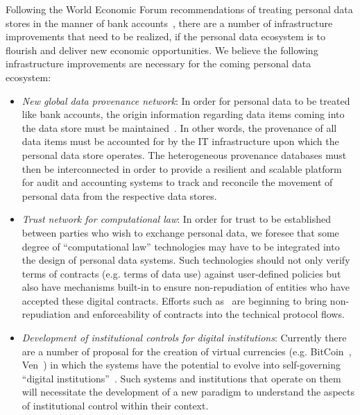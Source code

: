Following the World Economic Forum recommendations of treating personal data stores in the manner
of bank accounts~\cite{WEF2011}, there are a number of infrastructure improvements that need
to be realized, if the personal data ecosystem is to flourish and deliver new economic opportunities.
We believe the following infrastructure improvements are necessary for the coming personal data ecosystem:
\begin{itemize}
\item  {\em New global data provenance network}:  In order for personal data to be treated
like bank accounts, the origin information regarding data items coming into the data store
must be maintained~\cite{HardjonoGreenwood2013}. 
In other words, the provenance of all data items must be
accounted for by the IT infrastructure upon which the personal data store operates.
The heterogeneous provenance databases must then be interconnected in order
to provide a resilient and scalable platform for audit and accounting systems
to track and reconcile the movement of personal data from the respective data stores.

\item  {\em Trust network for computational law}: In order for trust to be established between
parties who wish to exchange personal data, we foresee that some degree of ``computational law''
technologies may have to be integrated into the design of personal data systems.
Such technologies should not only verify terms of contracts (e.g. terms of data use) against user-defined policies
but also have mechanisms built-in to ensure non-repudiation of entities
who have accepted these digital contracts.
Efforts such as~\cite{UMAcore,UMABindingObligations} are beginning to bring non-repudiation and enforceability of contracts
into the technical protocol flows.

\item  {\em Development of institutional controls for digital institutions}:
Currently there are a number of proposal for the creation of virtual currencies (e.g. BitCoin~\cite{BarberBoyen2012}, Ven~\cite{Stalnaker2013})
in which the systems have the potential to evolve into self-governing ``digital institutions''~\cite{HardjonoDeegan2014}.
Such systems and institutions that operate on them will necessitate the development of a new paradigm
to understand the aspects of institutional control within their context.


\end{itemize}




